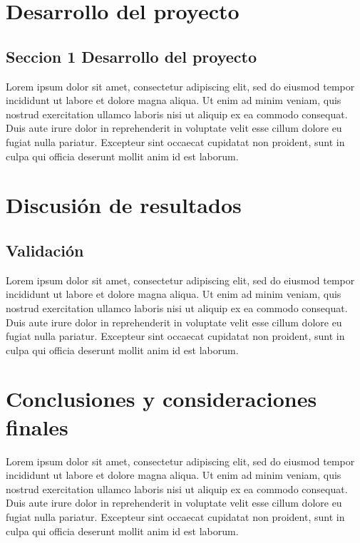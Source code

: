 \documentclass[11pt]{report} %
\begin{document}
\chapter{Desarrollo del proyecto}

\section{Seccion 1 Desarrollo del proyecto}

Lorem ipsum dolor sit amet, consectetur adipiscing elit, sed do eiusmod tempor incididunt ut labore et dolore magna aliqua. Ut enim ad minim veniam, quis nostrud exercitation ullamco laboris nisi ut aliquip ex ea commodo consequat. Duis aute irure dolor in reprehenderit in voluptate velit esse cillum dolore eu fugiat nulla pariatur. Excepteur sint occaecat cupidatat non proident, sunt in culpa qui officia deserunt mollit anim id est laborum.\\


\chapter{Discusión de resultados}

\section{Validación}

Lorem ipsum dolor sit amet, consectetur adipiscing elit, sed do eiusmod tempor incididunt ut labore et dolore magna aliqua. Ut enim ad minim veniam, quis nostrud exercitation ullamco laboris nisi ut aliquip ex ea commodo consequat. Duis aute irure dolor in reprehenderit in voluptate velit esse cillum dolore eu fugiat nulla pariatur. Excepteur sint occaecat cupidatat non proident, sunt in culpa qui officia deserunt mollit anim id est laborum.\\


\chapter{Conclusiones y consideraciones finales}

Lorem ipsum dolor sit amet, consectetur adipiscing elit, sed do eiusmod tempor incididunt ut labore et dolore magna aliqua. Ut enim ad minim veniam, quis nostrud exercitation ullamco laboris nisi ut aliquip ex ea commodo consequat. Duis aute irure dolor in reprehenderit in voluptate velit esse cillum dolore eu fugiat nulla pariatur. Excepteur sint occaecat cupidatat non proident, sunt in culpa qui officia deserunt mollit anim id est laborum.\\




\end{document}
